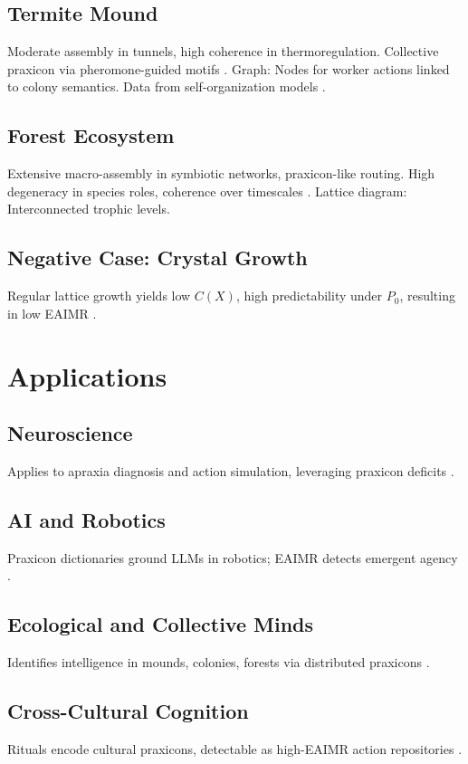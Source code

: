 \documentclass{article}
\begin{document}
\subsection{Termite Mound}
Moderate assembly in tunnels, high coherence in thermoregulation. Collective praxicon via pheromone-guided motifs \citep{turner2000}. Graph: Nodes for worker actions linked to colony semantics. Data from self-organization models \citep{camazine2001}.

\subsection{Forest Ecosystem}
Extensive macro-assembly in symbiotic networks, praxicon-like routing. High degeneracy in species roles, coherence over timescales \citep{levin2019}. Lattice diagram: Interconnected trophic levels.

\subsection{Negative Case: Crystal Growth}
Regular lattice growth yields low \(C(X)\), high predictability under \(P_0\), resulting in low EAIMR \citep{hazen2007}.

\section{Applications}
\label{sec:applications}

\subsection{Neuroscience}
Applies to apraxia diagnosis and action simulation, leveraging praxicon deficits \citep{peigneux2004, vannuscorps2023}.

\subsection{AI and Robotics}
Praxicon dictionaries ground LLMs in robotics; EAIMR detects emergent agency \citep{pastra2011, anderson2007}.

\subsection{Ecological and Collective Minds}
Identifies intelligence in mounds, colonies, forests via distributed praxicons \citep{camazine2001, simondon2017}.

\subsection{Cross-Cultural Cognition}
Rituals encode cultural praxicons, detectable as high-EAIMR action repositories \citep{ortega1961}.
\end{document}
